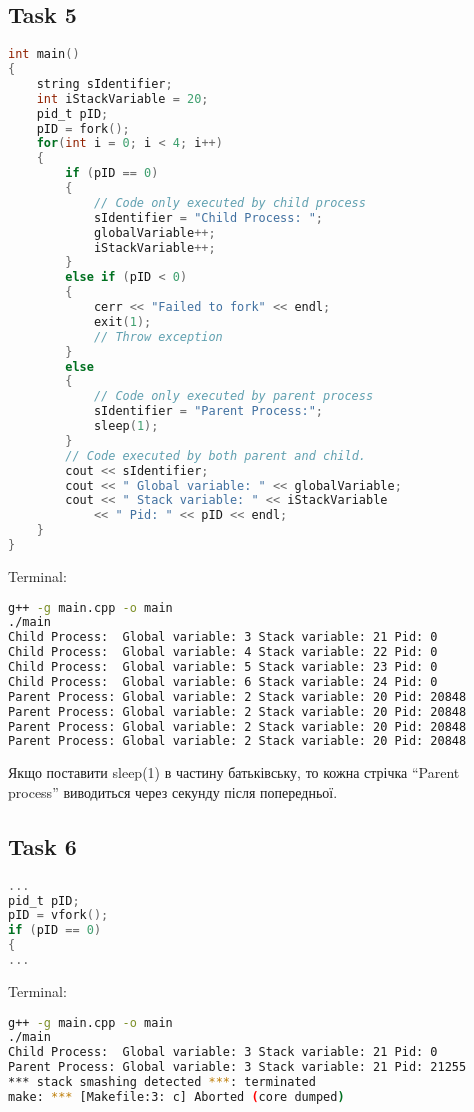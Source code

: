 \documentclass{article}
\begin{document}
\subsection*{Task 5}
\begin{lstlisting}[language=C]
int main()
{
	string sIdentifier;
	int iStackVariable = 20;
	pid_t pID;
	pID = fork();
	for(int i = 0; i < 4; i++)
	{
		if (pID == 0)
		{
			// Code only executed by child process
			sIdentifier = "Child Process: ";
			globalVariable++;
			iStackVariable++;
		}
		else if (pID < 0)
		{
			cerr << "Failed to fork" << endl;
			exit(1);
			// Throw exception
		}
		else
		{
			// Code only executed by parent process
			sIdentifier = "Parent Process:";
			sleep(1);
		}
		// Code executed by both parent and child.
		cout << sIdentifier;
		cout << " Global variable: " << globalVariable;
		cout << " Stack variable: " << iStackVariable 
			<< " Pid: " << pID << endl;
	}
}
\end{lstlisting}
Terminal:
\begin{lstlisting}[language=BASH]
g++ -g main.cpp -o main
./main
Child Process:  Global variable: 3 Stack variable: 21 Pid: 0
Child Process:  Global variable: 4 Stack variable: 22 Pid: 0
Child Process:  Global variable: 5 Stack variable: 23 Pid: 0
Child Process:  Global variable: 6 Stack variable: 24 Pid: 0
Parent Process: Global variable: 2 Stack variable: 20 Pid: 20848
Parent Process: Global variable: 2 Stack variable: 20 Pid: 20848
Parent Process: Global variable: 2 Stack variable: 20 Pid: 20848
Parent Process: Global variable: 2 Stack variable: 20 Pid: 20848
\end{lstlisting}

Якщо поставити sleep(1) в частину батьківську, то кожна стрічка ``Parent process'' виводиться через секунду після попередньої.
\newpage 
\subsection*{Task 6}
\begin{lstlisting}[language=C]
...
pid_t pID;
pID = vfork();
if (pID == 0)
{
...
\end{lstlisting}
Terminal:
\begin{lstlisting}[language=BASH]
g++ -g main.cpp -o main
./main
Child Process:  Global variable: 3 Stack variable: 21 Pid: 0
Parent Process: Global variable: 3 Stack variable: 21 Pid: 21255
*** stack smashing detected ***: terminated
make: *** [Makefile:3: c] Aborted (core dumped)
\end{lstlisting}
\end{document}
